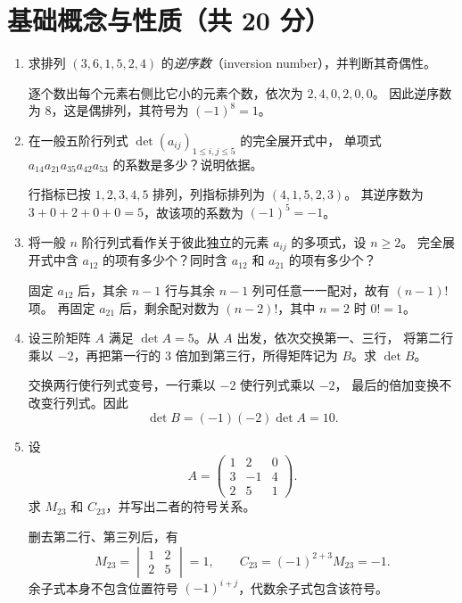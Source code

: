\documentclass[UTF8,12pt,a4paper,fontset=fandol]{ctexart}
\begin{document}
\section{基础概念与性质（共 20 分）}
\begin{enumerate}[label=\arabic*.,series=detquestions]

\item\label{q:inversions}
求排列 $(3,6,1,5,2,4)$ 的\emph{逆序数}（inversion number），并判断其奇偶性。
\begin{solve}
逐个数出每个元素右侧比它小的元素个数，依次为 $2,4,0,2,0,0$。
因此逆序数为 $8$，这是偶排列，其符号为 $(-1)^8=1$。
\end{solve}

\item\label{q:term-sign}
在一般五阶行列式 $\det(a_{ij})_{1\leq i,j\leq5}$ 的完全展开式中，
单项式 $a_{14}a_{21}a_{35}a_{42}a_{53}$ 的系数是多少？说明依据。
\begin{solve}
行指标已按 $1,2,3,4,5$ 排列，列指标排列为 $(4,1,5,2,3)$。
其逆序数为 $3+0+2+0+0=5$，故该项的系数为 $(-1)^5=-1$。
\end{solve}

\item\label{q:count-terms}
将一般 $n$ 阶行列式看作关于彼此独立的元素 $a_{ij}$ 的多项式，设 $n\geq2$。
完全展开式中含 $a_{12}$ 的项有多少个？同时含 $a_{12}$ 和 $a_{21}$ 的项有多少个？
\begin{solve}
固定 $a_{12}$ 后，其余 $n-1$ 行与其余 $n-1$ 列可任意一一配对，故有 $(n-1)!$ 项。
再固定 $a_{21}$ 后，剩余配对数为 $(n-2)!$，其中 $n=2$ 时 $0!=1$。
\end{solve}

\item\label{q:row-operations}
设三阶矩阵 $A$ 满足 $\det A=5$。从 $A$ 出发，依次交换第一、三行，
将第二行乘以 $-2$，再把第一行的 $3$ 倍加到第三行，所得矩阵记为 $B$。求 $\det B$。
\begin{solve}
交换两行使行列式变号，一行乘以 $-2$ 使行列式乘以 $-2$，
最后的倍加变换不改变行列式。因此
\[
\det B=(-1)(-2)\det A=10.
\]
\end{solve}

\item\label{q:minor-cofactor}
设
\[
A=\begin{pmatrix}1&2&0\\3&-1&4\\2&5&1\end{pmatrix}.
\]
求 $M_{23}$ 和 $C_{23}$，并写出二者的符号关系。
\begin{solve}
删去第二行、第三列后，有
\[
M_{23}=\begin{vmatrix}1&2\\2&5\end{vmatrix}=1,
\qquad C_{23}=(-1)^{2+3}M_{23}=-1.
\]
余子式本身不包含位置符号 $(-1)^{i+j}$，代数余子式包含该符号。
\end{solve}


\end{enumerate}
\end{document}
